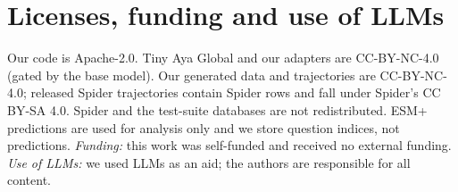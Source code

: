 \documentclass{article}
\begin{document}
\section{Licenses, funding and use of LLMs}
\label{app:licenses}

Our code is Apache-2.0. Tiny Aya Global and our adapters are CC-BY-NC-4.0 (gated by the base model). Our generated data and trajectories are CC-BY-NC-4.0; released Spider trajectories contain Spider rows and fall under Spider's CC BY-SA 4.0. Spider and the test-suite databases are not redistributed. ESM+ predictions are used for analysis only and we store question indices, not predictions. \emph{Funding:} this work was self-funded and received no external funding. \emph{Use of LLMs:} we used LLMs as an aid; the authors are responsible for all content.
\end{document}
